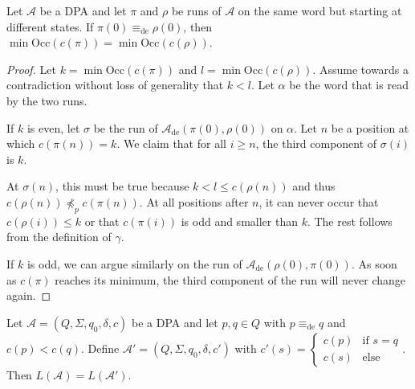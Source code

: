 \begin{lem}
\label{lem:fritzwilke:equiv_states_same_minpri}
	Let $\mathcal{A}$ be a DPA and let $\pi$ and $\rho$ be runs of $\mathcal{A}$ on the same word but starting at different states. If $\pi(0) \equiv_\text{de} \rho(0)$, then $\min \text{Occ}(c(\pi)) = \min \text{Occ}(c(\rho))$.
\end{lem}

\begin{proof}
	Let $k = \min \text{Occ}(c(\pi))$ and $l = \min \text{Occ}(c(\rho))$. Assume towards a contradiction without loss of generality that $k < l$. Let $\alpha$ be the word that is read by the two runs.
	
	If $k$ is even, let $\sigma$ be the run of $\mathcal{A}_\text{de}(\pi(0), \rho(0))$ on $\alpha$. Let $n$ be a position at which $c(\pi(n)) = k$. We claim that for all $i \geq n$, the third component of $\sigma(i)$ is $k$.
	
	At $\sigma(n)$, this must be true because $k < l \leq c(\rho(n))$ and thus $c(\rho(n)) \not\preceq_p c(\pi(n))$. At all positions after $n$, it can never occur that $c(\rho(i)) \leq k$ or that $c(\pi(i))$ is odd and smaller than $k$. The rest follows from the definition of $\gamma$.
	
	If $k$ is odd, we can argue similarly on the run of $\mathcal{A}_\text{de}(\rho(0), \pi(0))$. As soon as $c(\pi)$ reaches its minimum, the third component of the run will never change again.
\end{proof}

\begin{theorem}
\label{thm:fritzwilke:combine_priorities}
	Let $\mathcal{A} = (Q, \Sigma, q_0, \delta, c)$ be a DPA and let $p, q \in Q$ with $p \equiv_\text{de} q$ and $c(p) < c(q)$. Define $\mathcal{A}' = (Q, \Sigma, q_0, \delta, c')$ with $c'(s) = \begin{cases} c(p) & \text{if } s = q \\ c(s) & \text{else} \end{cases}$. Then $L(\mathcal{A}) = L(\mathcal{A}')$.
\end{theorem}

